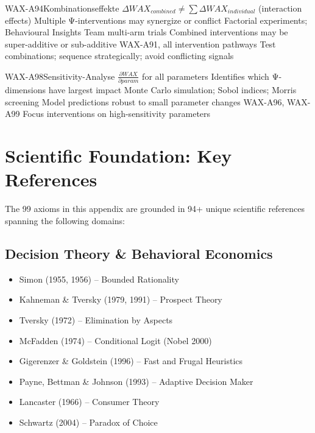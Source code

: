 \begin{axiomspec}{WAX-A94}{Kombinationseffekte}
 $\Delta WAX_{combined} \neq \sum \Delta WAX_{individual}$ (interaction effects)
 Multiple Ψ-interventions may synergize or conflict
 Factorial experiments; Behavioural Insights Team multi-arm trials
 Combined interventions may be super-additive or sub-additive
 WAX-A91, all intervention pathways
 Test combinations; sequence strategically; avoid conflicting signals
\end{axiomspec}


\begin{axiomspec}{WAX-A98}{Sensitivity-Analyse}
 $\frac{\partial WAX}{\partial param}$ for all parameters
 Identifies which Ψ-dimensions have largest impact
 Monte Carlo simulation; Sobol indices; Morris screening
 Model predictions robust to small parameter changes
 WAX-A96, WAX-A99
 Focus interventions on high-sensitivity parameters
\end{axiomspec}



\section{Scientific Foundation: Key References}
\label{sec:av-references}

The 99 axioms in this appendix are grounded in 94+ unique scientific references
spanning the following domains:

\subsection{Decision Theory \& Behavioral Economics}
\begin{itemize}
\item Simon (1955, 1956) -- Bounded Rationality
\item Kahneman \& Tversky (1979, 1991) -- Prospect Theory
\item Tversky (1972) -- Elimination by Aspects
\item McFadden (1974) -- Conditional Logit (Nobel 2000)
\item Gigerenzer \& Goldstein (1996) -- Fast and Frugal Heuristics
\item Payne, Bettman \& Johnson (1993) -- Adaptive Decision Maker
\item Lancaster (1966) -- Consumer Theory
\item Schwartz (2004) -- Paradox of Choice
\end{itemize}


